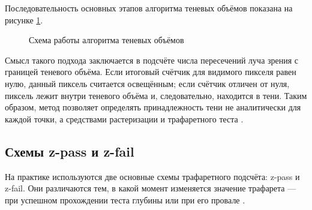 \documentclass[a4paper, 12pt]{article}
\begin{document}
Последовательность основных этапов алгоритма теневых объёмов показана на рисунке \ref{fig:shadow-volume-scheme}.

\begin{figure}[h]
	\begin{center}
	\end{center}
	\caption{\label{fig:shadow-volume-scheme}Схема работы алгоритма теневых объёмов}
\end{figure}

Смысл такого подхода заключается в подсчёте числа пересечений луча зрения с границей теневого объёма. Если итоговый счётчик для видимого пикселя равен нулю, данный пиксель считается освещённым; если счётчик отличен от нуля, пиксель лежит внутри теневого объёма и, следовательно, находится в тени. Таким образом, метод позволяет определять принадлежность тени не аналитически для каждой точки, а средствами растеризации и трафаретного теста \cite{heidmann1991,stich2007}.

\subsection{Схемы z-pass и z-fail}

На практике используются две основные схемы трафаретного подсчёта: z-pass и z-fail. Они различаются тем, в какой момент изменяется значение трафарета --- при успешном прохождении теста глубины или при его провале \cite{everitt2002,stich2007}.
\end{document}

